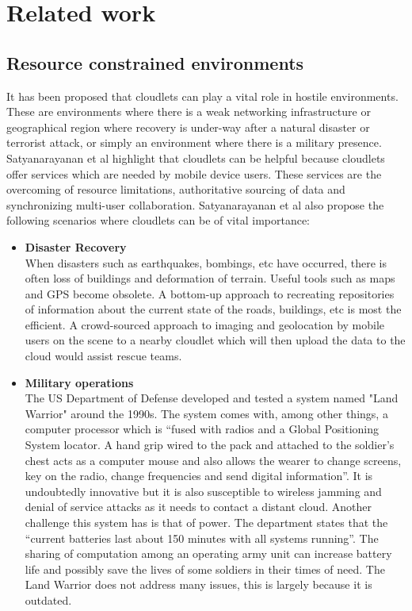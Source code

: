 \section{Related work}

\subsection{Resource constrained environments}
It has been proposed that cloudlets can play a vital role in hostile environments\cite{RefWorks:107}. These are environments
where there is a weak networking infrastructure or geographical region where recovery is under-way after a natural disaster or terrorist attack, or simply an environment where there is a military presence. Satyanarayanan et al\cite{RefWorks:107} highlight that cloudlets can be helpful because cloudlets offer services which are needed by mobile device users. These
services are the overcoming of resource limitations, authoritative sourcing of data and synchronizing multi-user collaboration. Satyanarayanan et al\cite{RefWorks:107} also propose the following scenarios where cloudlets can be of vital importance:

\begin{itemize}

\item \textbf{Disaster Recovery} \\ When disasters such as earthquakes, bombings, etc have occurred, there is often loss of buildings and deformation of terrain. Useful tools such as maps and GPS become obsolete. A bottom-up approach to recreating repositories of information about the current state of the roads, buildings, etc is most the efficient. A crowd-sourced approach to imaging and geolocation by mobile users on the scene to a nearby cloudlet which will then upload the data to the cloud would assist rescue teams.

\item \textbf{Military operations} \\ The US Department of Defense developed and tested a system named "Land Warrior" around the 1990s\cite{usdefense}. The system comes with, among other things, a computer processor which is ``fused with radios and a Global Positioning System locator. A hand grip wired to the pack and attached to the soldier's chest acts as a computer mouse and also allows the wearer to change screens, key on the radio, change frequencies and send digital information''\cite{usdefense}. It is undoubtedly innovative but it is also susceptible to wireless jamming and denial of service attacks as it needs to contact a distant cloud. Another challenge this system has is that of power. The department states that the ``current batteries last about 150 minutes with all systems running''\cite{usdefense}. The sharing of computation among an operating army unit can increase battery life and possibly save the lives of some soldiers in their times of need. The Land Warrior does not address many issues, this is largely because it is outdated.
\end{itemize}

